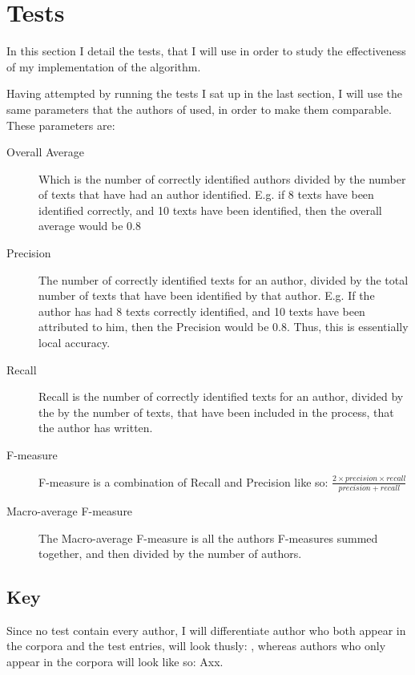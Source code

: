 \section{Tests}
\label{tests}

In this section I detail the tests, that I will use in order to study the effectiveness of my implementation of the algorithm.

Having attempted by running the tests I sat up in the last section, I will use the same parameters that the authors of \cite{nr4} used, in order to make them comparable. These parameters are: 

\begin{description}
\item[Overall Average] Which is the number of correctly identified authors divided by the number of texts that have had an author identified. E.g. if 8 texts have been identified correctly, and 10 texts have been identified, then the overall average would be 0.8 

\item[Precision] The number of correctly identified texts for an author, divided by the total number of texts that have been identified by that author. E.g. If the author has had 8 texts correctly identified, and 10 texts have been attributed to him, then the Precision would be 0.8. Thus, this is essentially local accuracy.

\item[Recall] Recall is the number of correctly identified texts for an author, divided by the by the number of texts, that have been included in the process, that the author has written.

\item[F-measure] F-measure is a combination of Recall and Precision like so: $\frac{2 \times precision \times recall}{precision+recall}$ 

\item[Macro-average F-measure] The Macro-average F-measure is all the authors F-measures summed together, and then divided by the number of authors. 
\end{description}

\subsection{Key}
Since no test contain every author, I will differentiate author who both appear in the corpora and the test entries, will look thusly: , whereas authors who only appear in the corpora will look like so: Axx.

